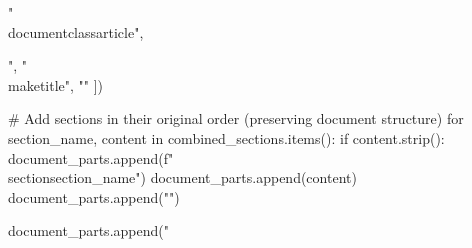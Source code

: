 "\\documentclass{article}",
\begin{document}
",
            "\\maketitle",
            ""
        ])
        
        # Add sections in their original order (preserving document structure)
        for section_name, content in combined_sections.items():
            if content.strip():
                document_parts.append(f"\\section{{{section_name}}}")
                document_parts.append(content)
                document_parts.append("")
        
        document_parts.append("\
\end{document}
